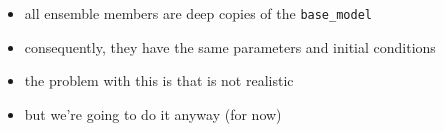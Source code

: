 \documentclass[12pt, twoside, a4paper]{report}
\begin{document}
\begin{itemize}
\begin{itemize}
\begin{itemize}
                    \item all ensemble members are deep copies of the
                        \texttt{base\_model}
                    \item consequently, they have the same parameters and
                        initial conditions
                    \item the problem with this is that is not realistic
                    \item but we're going to do it anyway (for now)
                \end{itemize}
        \end{itemize}
\end{itemize}











\label{ch:bibliography}
\end{document}
